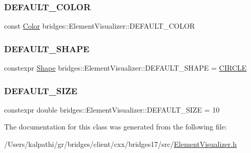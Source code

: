\subsubsection{\texorpdfstring{D\+E\+F\+A\+U\+L\+T\+\_\+\+C\+O\+L\+OR}{DEFAULT\_COLOR}}
{\footnotesize\ttfamily const \mbox{\hyperlink{classbridges_1_1_color}{Color}} bridges\+::\+Element\+Visualizer\+::\+D\+E\+F\+A\+U\+L\+T\+\_\+\+C\+O\+L\+OR\hspace{0.3cm}{\ttfamily [static]}}

\mbox{\label{classbridges_1_1_element_visualizer_a2800a212357180e4941a818b958aabd9}} 
\subsubsection{\texorpdfstring{D\+E\+F\+A\+U\+L\+T\+\_\+\+S\+H\+A\+PE}{DEFAULT\_SHAPE}}
{\footnotesize\ttfamily constexpr \mbox{\hyperlink{namespacebridges_a1b4050586bd708782ae0d4f3b06b9579}{Shape}} bridges\+::\+Element\+Visualizer\+::\+D\+E\+F\+A\+U\+L\+T\+\_\+\+S\+H\+A\+PE = \mbox{\hyperlink{namespacebridges_a1b4050586bd708782ae0d4f3b06b9579aa968bf0f7aeccbae1a40751345bf2e64}{C\+I\+R\+C\+LE}}\hspace{0.3cm}{\ttfamily [static]}}

\mbox{\label{classbridges_1_1_element_visualizer_a81cc788d6149d5d582099cbc35e18c5a}} 
\subsubsection{\texorpdfstring{D\+E\+F\+A\+U\+L\+T\+\_\+\+S\+I\+ZE}{DEFAULT\_SIZE}}
{\footnotesize\ttfamily constexpr double bridges\+::\+Element\+Visualizer\+::\+D\+E\+F\+A\+U\+L\+T\+\_\+\+S\+I\+ZE = 10\hspace{0.3cm}{\ttfamily [static]}}



The documentation for this class was generated from the following file\+:\begin{DoxyCompactItemize}
\item 
/\+Users/kalpathi/gr/bridges/client/cxx/bridges17/src/\mbox{\hyperlink{_element_visualizer_8h}{Element\+Visualizer.\+h}}\end{DoxyCompactItemize}
